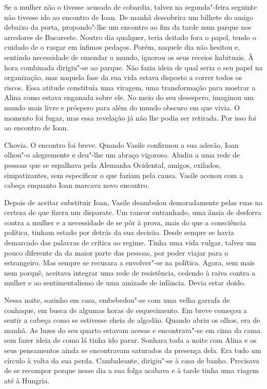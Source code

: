 Se a mulher não o tivesse acusado de cobardia, talvez na segunda"-feira
seguinte não tivesse ido ao encontro de Ioan. De manhã descobrira um
bilhete do amigo debaixo da porta, propondo"-lhe um encontro ao fim da
tarde num parque nos arredores de Bucareste. Noutro dia qualquer, teria
deitado fora o papel, tendo o cuidado de o rasgar em ínfimos pedaços.
Porém, naquele dia não hesitou e, sentindo necessidade de emendar o
mundo, ignorou os seus receios habituais. À hora combinada dirigiu"-se ao
parque. Não fazia ideia de qual seria o seu papel na organização,
mas naquela fase da sua vida estava disposto a correr todos os riscos.
Essa atitude constituía uma viragem, uma transformação para mostrar a
Alina como estava enganada sobre ele. No meio do seu desespero,
imaginou um mundo mais livre e próspero para além do mundo obscuro em
que vivia. O momento foi fugaz, mas essa revelação já não lhe podia ser
retirada. Por isso foi ao encontro de Ioan.

Chovia. O encontro foi
breve. Quando Vasile confirmou a sua adesão, Ioan olhou"-o alegremente
e deu"-lhe um abraço vigoroso. Aludiu a uma rede de pessoas que se
espalhava pela Alemanha Ocidental, amigos, exilados, simpatizantes, sem
especificar o que faziam pela causa.
Vasile acenou com a cabeça enquanto Ioan marcava novo encontro.

Depois de aceitar substituir Ioan, Vasile deambulou demoradamente pelas
ruas na certeza de que fizera um disparate. Um rancor entranhado, uma
ânsia de desforra contra a mulher e a necessidade de se pôr à prova,
mais do que a consciência política, tinham estado por detrás da sua
decisão. Desde sempre se havia demarcado das palavras de crítica ao
regime. Tinha uma vida vulgar, talvez um pouco diferente da da maior
parte das pessoas, por poder viajar para o estrangeiro. Mas sempre se
recusara a envolver"-se na política. Agora, sem mais nem porquê, aceitava
integrar uma rede de resistência, cedendo à raiva contra a mulher e ao
sentimentalismo de uma amizade de infância. Devia estar doido.

Nessa noite, sozinho em casa, embebedou"-se com uma velha garrafa de
conhaque, em busca de algumas horas de esquecimento. Em breve começou a
sentir a cabeça como
se estivesse cheia de algodão. Quando abriu os olhos, era de manhã. As
luzes do seu quarto estavam acesas e encontrava"-se em cima da cama sem
fazer ideia de como lá tinha ido parar. Sonhara toda a noite com Alina e
os seus pensamentos ainda se encontravam saturados da presença dela. Era
tudo um círculo à volta da sua perda. Cambaleante, dirigiu"-se à casa
de banho. Precisava de se recompor porque nesse dia a sua folga
acabava e à tarde tinha uma viagem até à Hungria.

